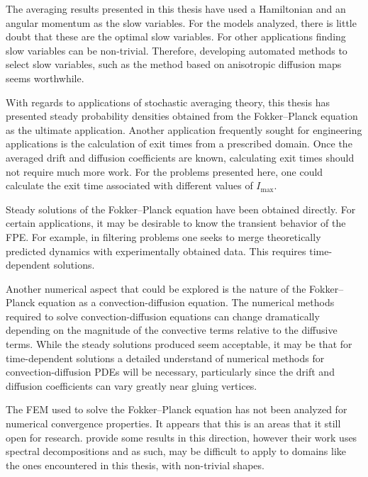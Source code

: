 
The averaging results presented in this thesis have used a Hamiltonian and an angular momentum as the slow variables. For the models analyzed, there is little doubt that these are the optimal slow variables. For other applications finding slow variables can be non-trivial. Therefore, developing automated methods to select slow variables, such as the method based on anisotropic diffusion maps \citep{singer09:_detec} seems worthwhile.

With regards to applications of stochastic averaging theory, this thesis has presented steady probability densities obtained from the Fokker--Planck equation as the ultimate application. Another application frequently sought for engineering applications is the calculation of exit times from a prescribed domain. Once the averaged drift and diffusion coefficients are known, calculating exit times should not require much more work. For the problems presented here, one could calculate the exit time associated with different values of $I_\text{max}$.

Steady solutions of the Fokker--Planck equation have been obtained directly. For certain applications, it may be desirable to know the transient behavior of the FPE. For example, in filtering problems one seeks to merge theoretically predicted dynamics with experimentally obtained data. This requires time-dependent solutions.

Another numerical aspect that could be explored is the nature of the Fokker--Planck equation as a convection-diffusion equation. The numerical methods required to solve convection-diffusion equations can change dramatically depending on the magnitude of the convective terms relative to the diffusive terms. While the steady solutions produced seem acceptable, it may be that for time-dependent solutions a detailed understand of numerical methods for convection-diffusion PDEs will be necessary, particularly since the drift and diffusion coefficients can vary greatly near gluing vertices.

The FEM used to solve the Fokker--Planck equation has not been analyzed for numerical convergence properties. It appears that this is an areas that it still open for research. \citet{kumar09:_fokker_planc} provide some results in this direction, however their work uses spectral decompositions and as such, may be difficult to apply to domains like the ones encountered in this thesis, with non-trivial shapes.

